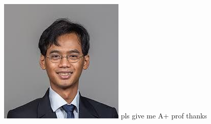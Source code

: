 \documentclass[10pt, landscape]{article}
\begin{document}
\begin{multicols*}{4}
\begin{center}
    \includegraphics[width=\linewidth]{prof.jpg}
    pls give me A+ prof thanks
\end{center}

\end{multicols*}
\end{document}
